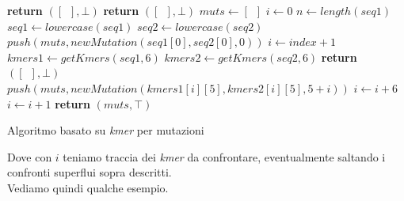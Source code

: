 \documentclass[a4paper,12pt, oneside]{book}
\begin{document}
\begin{algorithm}
  \small
  \begin{algorithmic}[1]
    \State \textbf{return} $([\,\,\,],\bot)$
    \EndIf
    \State \textbf{return} $([\,\,\,],\bot)$
    \EndIf
    \State $muts \gets [\,\,\,]$
    \State $i\gets 0$
    \State $n\gets length(seq1)$
    \State $seq1\gets lowercase(seq1)$
    \State $seq2\gets lowercase(seq2)$
    \State $push(muts, newMutation(seq1[0], seq2[0], 0))$
    \State $i \gets index+1$
    \EndIf
    \State $kmers1\gets getKmers(seq1,6)$
    \State $kmers2\gets getKmers(seq2,6)$
    \State \textbf{return} $([\,\,\,],\bot)$
    \EndIf
    \State $push(muts, newMutation(kmers1[i][5], kmers2[i][5], 5+i))$
    \State $i\gets i+6$
    \Else
    \State $i\gets i+1$
    \EndIf
    \EndWhile
    \State \textbf{return} $(muts, \top)$
    \EndFunction
  \end{algorithmic}
  \caption{Algoritmo basato su \textit{kmer} per mutazioni}
\end{algorithm}
\newpage
Dove con $i$ teniamo traccia dei \textit{kmer} da confrontare, eventualmente
saltando i confronti superflui sopra descritti.\\
Vediamo quindi qualche esempio.
\end{document}
